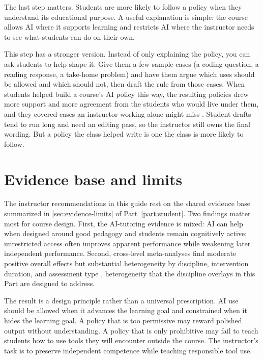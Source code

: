 \documentclass{SIAMbook2023}
\begin{document}
The last step matters. Students are more likely to follow a policy when they understand its educational purpose. A useful explanation is simple: the course allows AI where it supports learning and restricts AI where the instructor needs to see what students can do on their own.

This step has a stronger version. Instead of only explaining the policy, you can ask students to help shape it. Give them a few sample cases (a coding question, a reading response, a take-home problem) and have them argue which uses should be allowed and which should not, then draft the rule from those cases. When students helped build a course's AI policy this way, the resulting policies drew more support and more agreement from the students who would live under them, and they covered cases an instructor working alone might miss \citep{kuo2025policycraft}. Student drafts tend to run long and need an editing pass, so the instructor still owns the final wording. But a policy the class helped write is one the class is more likely to follow.

\section{Evidence base and limits}
\label{i:sec:evidence-limits}

The instructor recommendations in this guide rest on the shared evidence base summarized in \cref{sec:evidence-limits} of Part~\ref{part:student}. Two findings matter most for course design. First, the AI-tutoring evidence is mixed: AI can help when designed around good pedagogy and students remain cognitively active; unrestricted access often improves apparent performance while weakening later independent performance. Second, cross-level meta-analyses find moderate positive overall effects but substantial heterogeneity by discipline, intervention duration, and assessment type \citep{liu2025effects,ma2025meta}, heterogeneity that the discipline overlays in this Part are designed to address.

The result is a design principle rather than a universal prescription. AI use should be allowed when it advances the learning goal and constrained when it hides the learning goal. A policy that is too permissive may reward polished output without understanding. A policy that is only prohibitive may fail to teach students how to use tools they will encounter outside the course. The instructor's task is to preserve independent competence while teaching responsible tool use.
\end{document}

